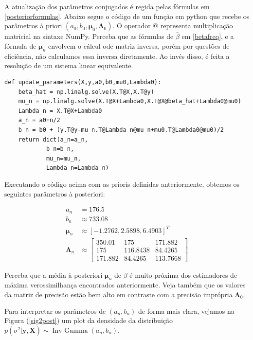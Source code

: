 \documentclass[12pt,letterpaper]{article}
\newcommand{\bd}[1]{\boldsymbol{#1}}
\newcommand{\op}{\operatorname}
\begin{document}
	A atualização dos parâmetros conjugados é regida pelas fórmulas em \ref{posteriorformulas}. Abaixo segue o código de um função em python que recebe os parâmetros à priori $(a_0,b_0,\bd\mu_0,\bd\Lambda_0)$. O operador @ representa multiplicação matricial na sintaxe NumPy. Perceba que as fórmulas de $\hat\beta$ em \ref{betafreq}, e a fórmula de $\bd\mu_n$ envolvem o cálcul ode matriz inversa, porém por questões de eficiência, não calculamos essa inversa diretamente. Ao invés disso, é feita a resolução de um sistema linear equivalente.
	
	\begin{lstlisting}[language=iPython]
def update_parameters(X,y,a0,b0,mu0,Lambda0):
	beta_hat = np.linalg.solve(X.T@X,X.T@y)
	mu_n = np.linalg.solve(X.T@X+Lambda0,X.T@X@beta_hat+Lambda0@mu0)
	Lambda_n = X.T@X+Lambda0
	a_n = a0+n/2
	b_n = b0 + (y.T@y-mu_n.T@Lambda_n@mu_n+mu0.T@Lambda0@mu0)/2
	return dict(a_n=a_n,
		    b_n=b_n,
		    mu_n=mu_n,
		    Lambda_n=Lambda_n)
	\end{lstlisting}
	
	Executando o código acima com as prioris definidas anteriormente, obtemos os seguintes parâmetros à posteriori:
	
	\begin{align*}
		a_n&=176.5\\
		b_n&\approx733.08\\
		\bd\mu_n&\approx [-1.2762,  2.5898,  6.4903]^T\\
		\bd\Lambda_n&\approx \begin{bmatrix}
			350.01& 175  & 171.882\\
			175 &  116.8438 &  84.4265\\
			171.882 &  84.4265& 113.7668
		\end{bmatrix}
	\end{align*}

	Perceba que a média à posteriori $\bd\mu_n$ de $\beta$ é muito próxima dos estimadores de máxima verossimilhança encontrados anteriormente. Veja também que os valores da matriz de precisão estão bem alto em contraste com a precisão imprópria $\bd\Lambda_0$. 
	
	Para interpretar os parâmetros de $(a_n,b_n)$ de forma mais clara, vejamos na Figura (\ref{sig2post}) um plot da densidade da distribuição $p(\sigma^2|\bd y,\bd X)\sim\op{Inv-Gamma}(a_n,b_n)$.
	
\end{document}
